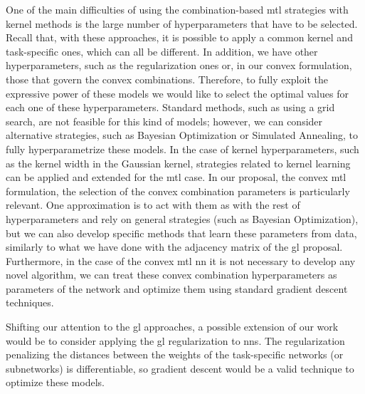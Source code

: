 One of the main difficulties of using the combination-based \acrshort{mtl} strategies with kernel methods is the large number of hyperparameters that have to be selected. Recall that, with these approaches, it is possible to apply a common kernel and task-specific ones, which can all be different. In addition, we have other hyperparameters, such as the regularization ones or, in our convex formulation, those that govern the convex combinations. 
%
Therefore, to fully exploit the expressive power of these models we would like to select the optimal values for each one of these hyperparameters. Standard methods, such as using a grid search, are not feasible for this kind of models; however, we can consider alternative strategies, such as Bayesian Optimization or Simulated Annealing, to fully hyperparametrize these models.
In the case of kernel hyperparameters, such as the kernel width in the Gaussian kernel, strategies related to kernel learning can be applied and extended for the \acrshort{mtl} case. 
In our proposal, the convex \acrshort{mtl} formulation, the selection of the convex combination parameters is particularly relevant. One approximation is to act with them as with the rest of hyperparameters and rely on general strategies (such as Bayesian Optimization), but we can also develop specific methods that learn these parameters from data, similarly to what we have done with the adjacency matrix of the \acrshort{gl} proposal.
Furthermore, in the case of the convex \acrshort{mtl} \acrshort{nn} it is not necessary to develop any novel algorithm, we can treat these convex combination hyperparameters as parameters of the network and optimize them using standard gradient descent techniques.

Shifting our attention to the \acrshort{gl} approaches, a possible extension of our work would be to consider applying the \acrshort{gl} regularization to \acrshort{nns}.
The regularization penalizing the distances between the weights of the task-specific networks (or subnetworks) is differentiable, so gradient descent would be a valid technique to optimize these models.



